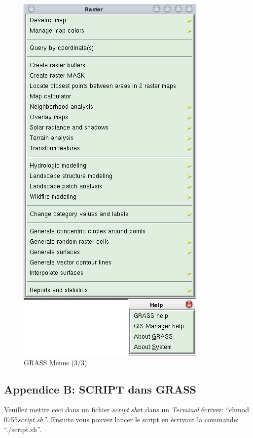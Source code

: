 \begin{figure}[htbp]
   \centering
   \includegraphics[scale=0.4]{grass027.png}
   \caption{GRASS Menus (3/3)}
   \label{fig:grass027}
\end{figure}

\newpage

\subsection{Appendice B: SCRIPT dans GRASS}
\label{appendixB}

Veuillez mettre ceci dans un fichier \textit{script.sh}\textup{et dans un }\textit{Terminal}\textup{ \'ecrivez: ``chmod 0755}\textit{script.sh''}\textup{. Ensuite vous pouvez lancer le script }en \'ecrivant la commande: ``./script.sh''.

